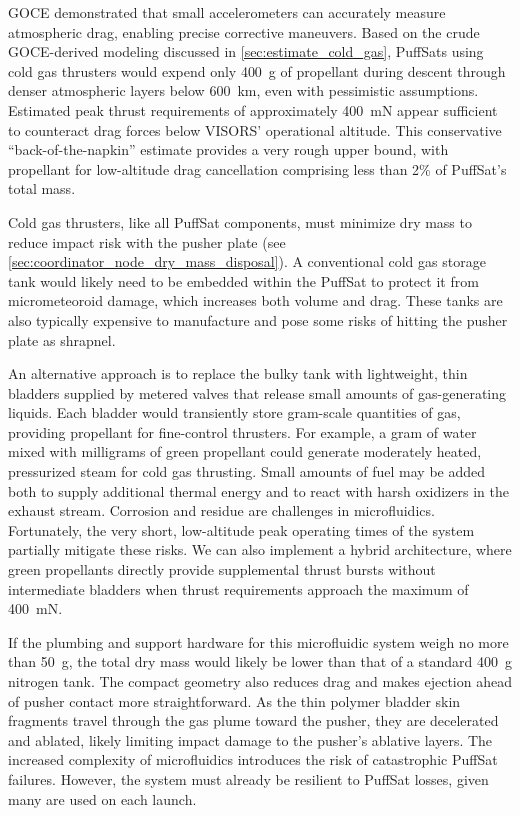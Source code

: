 \documentclass{article}
\begin{document}
GOCE demonstrated that small accelerometers can accurately measure atmospheric drag, enabling precise corrective maneuvers. Based on the crude GOCE-derived modeling discussed in \autoref{sec:estimate_cold_gas}, PuffSats using cold gas thrusters would expend only \SI{400}{\gram} of propellant during descent through denser atmospheric layers below \SI{600}{\kilo\meter}, even with pessimistic assumptions. Estimated peak thrust requirements of approximately \SI{400}{\milli\newton} appear sufficient to counteract drag forces below VISORS' operational altitude. This conservative “back-of-the-napkin” estimate provides a very rough upper bound, with propellant for low-altitude drag cancellation comprising less than 2\% of PuffSat's total mass.

Cold gas thrusters, like all PuffSat components, must minimize dry mass to reduce impact risk with the pusher plate (see \autoref{sec:coordinator_node_dry_mass_disposal}). A conventional cold gas storage tank would likely need to be embedded within the PuffSat to protect it from micrometeoroid damage, which increases both volume and drag. These tanks are also typically expensive to manufacture and pose some risks of hitting the pusher plate as shrapnel.

An alternative approach is to replace the bulky tank with lightweight, thin bladders supplied by metered valves that release small amounts of gas-generating liquids. Each bladder would transiently store gram-scale quantities of gas, providing propellant for fine-control thrusters. For example, a gram of water mixed with milligrams of green propellant could generate moderately heated, pressurized steam for cold gas thrusting. Small amounts of fuel may be added both to supply additional thermal energy and to react with harsh oxidizers in the exhaust stream.  Corrosion and residue are challenges in microfluidics. Fortunately, the very short, low-altitude peak operating times of the system partially mitigate these risks. We can also implement a hybrid architecture, where green propellants directly provide supplemental thrust bursts without intermediate bladders when thrust requirements approach the maximum of \SI{400}{\milli\newton}.

If the plumbing and support hardware for this microfluidic system weigh no more than \SI{50}{\gram}, the total dry mass would likely be lower than that of a standard \SI{400}{\gram} nitrogen tank. The compact geometry also reduces drag and makes ejection ahead of pusher contact more straightforward. As the thin polymer bladder skin fragments travel through the gas plume toward the pusher, they are decelerated and ablated, likely limiting impact damage to the pusher's ablative layers.  The increased complexity of microfluidics introduces the risk of catastrophic PuffSat failures. However, the system must already be resilient to PuffSat losses, given many are used on each launch.
\end{document}

